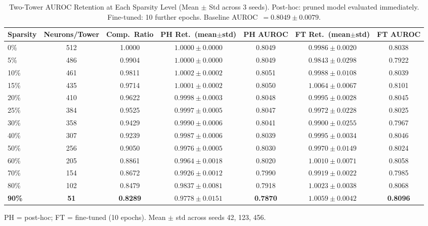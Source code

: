 \documentclass[journal]{IEEEtran}
\begin{document}
\begin{table}[!t]
  \caption{Two-Tower AUROC Retention at Each Sparsity Level (Mean $\pm$ Std across 3 seeds).
    Post-hoc: pruned model evaluated immediately. Fine-tuned: 10 further epochs.
    Baseline AUROC~$= 0.8049 \pm 0.0079$.}
  \label{tab:pruning_full}
  \centering
  \small
  \begin{tabular}{lcccccc}
    \hline
    Sparsity & Neurons/Tower & Comp.\ Ratio & PH Ret.\ (mean$\pm$std) & PH AUROC & FT Ret.\ (mean$\pm$std) & FT AUROC \\
    \hline
    0\%            & 512  & 1.0000 & $1.0000 \pm 0.0000$ & 0.8049 & $0.9986 \pm 0.0020$ & 0.8038 \\
    5\%            & 486  & 0.9904 & $1.0000 \pm 0.0000$ & 0.8049 & $0.9843 \pm 0.0298$ & 0.7922 \\
    10\%           & 461  & 0.9811 & $1.0002 \pm 0.0002$ & 0.8051 & $0.9988 \pm 0.0108$ & 0.8039 \\
    15\%           & 435  & 0.9714 & $1.0001 \pm 0.0002$ & 0.8050 & $1.0064 \pm 0.0067$ & 0.8101 \\
    20\%           & 410  & 0.9622 & $0.9998 \pm 0.0003$ & 0.8048 & $0.9995 \pm 0.0028$ & 0.8045 \\
    25\%           & 384  & 0.9525 & $0.9997 \pm 0.0005$ & 0.8047 & $0.9972 \pm 0.0228$ & 0.8025 \\
    30\%           & 358  & 0.9429 & $0.9990 \pm 0.0006$ & 0.8041 & $0.9900 \pm 0.0255$ & 0.7967 \\
    40\%           & 307  & 0.9239 & $0.9987 \pm 0.0006$ & 0.8039 & $0.9995 \pm 0.0034$ & 0.8046 \\
    50\%           & 256  & 0.9050 & $0.9976 \pm 0.0005$ & 0.8030 & $0.9970 \pm 0.0149$ & 0.8024 \\
    60\%           & 205  & 0.8861 & $0.9964 \pm 0.0018$ & 0.8020 & $1.0010 \pm 0.0071$ & 0.8058 \\
    70\%           & 154  & 0.8672 & $0.9926 \pm 0.0012$ & 0.7990 & $0.9919 \pm 0.0022$ & 0.7985 \\
    80\%           & 102  & 0.8479 & $0.9837 \pm 0.0081$ & 0.7918 & $1.0023 \pm 0.0038$ & 0.8068 \\
    \textbf{90\%}  & \textbf{51} & \textbf{0.8289} & $\mathbf{0.9778 \pm 0.0151}$ & \textbf{0.7870} & $\mathbf{1.0059 \pm 0.0042}$ & \textbf{0.8096} \\
    \hline
  \end{tabular}
  \smallskip

  \noindent\small PH = post-hoc; FT = fine-tuned (10 epochs).
  Mean $\pm$ std across seeds 42, 123, 456.
\end{table}
\end{document}
